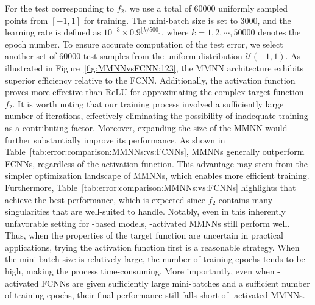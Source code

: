 \documentclass[11pt,a4paper]{article}
\let\dots\cdots
\begin{document}
For the test corresponding to \( f_2 \), we use a total of 60000 uniformly sampled points from \( [-1,1] \) for training. The mini-batch size is set to 3000, and the learning rate is defined as \( 10^{-3} \times 0.9^{\lfloor k/500 \rfloor} \), where \( k = 1,2,\dots,50000 \) denotes the epoch number. 
To ensure accurate computation of the test error, we select another set of 60000 test samples from the uniform distribution \( \mathcal{U}(-1,1) \). 
As illustrated in Figure~\ref{fig:MMNNvsFCNN:123}, the MMNN architecture exhibits superior efficiency relative to the FCNN. Additionally, the \sine{} activation function proves more effective than ReLU for approximating the complex target function \( f_2 \). It is worth noting that our training process involved a sufficiently large number of iterations, effectively eliminating the possibility of inadequate training as a contributing factor. Moreover, expanding the size of the MMNN would further substantially improve its performance.
As shown in Table~\ref{tab:error:comparison:MMNNs:vs:FCNNs}, MMNNs generally outperform FCNNs, regardless of the activation function. This advantage may stem from the simpler optimization landscape of MMNNs, which enables more efficient training.
Furthermore, Table~\ref{tab:error:comparison:MMNNs:vs:FCNNs} highlights that  achieve the best performance, which is expected since \( f_2 \) contains many singularities that  are well-suited to handle. Notably, even in this inherently unfavorable setting for \sine-based models, \sine{}-activated MMNNs still perform well. Thus, when the properties of the target function are uncertain in practical applications, trying the \sine{} activation function first is a reasonable strategy.
When the mini-batch size is relatively large, the number of training epochs tends to be high, making the process time-consuming. More importantly, even when \sine-activated FCNNs are given sufficiently large mini-batches and a sufficient number of training epochs, their final performance still falls short of \sine-activated MMNNs.
\end{document}
